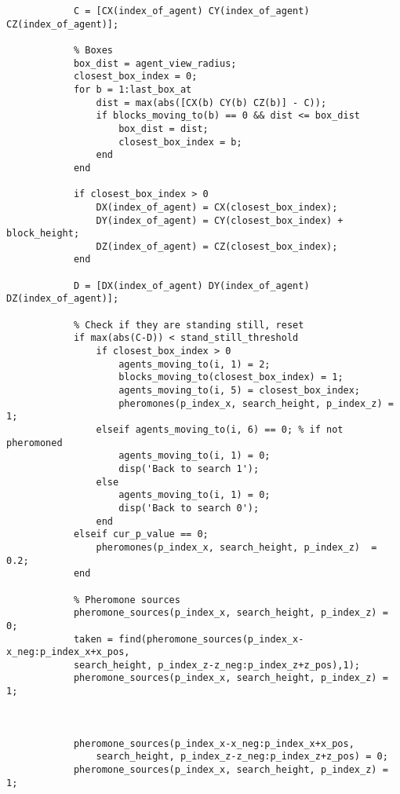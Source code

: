 \begin{lstlisting}
            C = [CX(index_of_agent) CY(index_of_agent) CZ(index_of_agent)];

            % Boxes
            box_dist = agent_view_radius;
            closest_box_index = 0;
            for b = 1:last_box_at 
                dist = max(abs([CX(b) CY(b) CZ(b)] - C));
                if blocks_moving_to(b) == 0 && dist <= box_dist
                    box_dist = dist;
                    closest_box_index = b;
                end
            end
           
            if closest_box_index > 0
                DX(index_of_agent) = CX(closest_box_index);
                DY(index_of_agent) = CY(closest_box_index) + block_height;
                DZ(index_of_agent) = CZ(closest_box_index);
            end
                
            D = [DX(index_of_agent) DY(index_of_agent) DZ(index_of_agent)];
            
            % Check if they are standing still, reset
            if max(abs(C-D)) < stand_still_threshold
                if closest_box_index > 0
                    agents_moving_to(i, 1) = 2;
                    blocks_moving_to(closest_box_index) = 1;
                    agents_moving_to(i, 5) = closest_box_index;
                    pheromones(p_index_x, search_height, p_index_z) = 1;  
                elseif agents_moving_to(i, 6) == 0; % if not pheromoned
                    agents_moving_to(i, 1) = 0;
                    disp('Back to search 1');
                else
                    agents_moving_to(i, 1) = 0;
                    disp('Back to search 0');
                end
            elseif cur_p_value == 0;
                pheromones(p_index_x, search_height, p_index_z)  = 0.2; 
            end
          
            % Pheromone sources
            pheromone_sources(p_index_x, search_height, p_index_z) = 0;
            taken = find(pheromone_sources(p_index_x-x_neg:p_index_x+x_pos, 
			search_height, p_index_z-z_neg:p_index_z+z_pos),1);
            pheromone_sources(p_index_x, search_height, p_index_z) = 1;
         
       
            
            pheromone_sources(p_index_x-x_neg:p_index_x+x_pos, 
				search_height, p_index_z-z_neg:p_index_z+z_pos) = 0;
            pheromone_sources(p_index_x, search_height, p_index_z) = 1;
            

            
            


\end{lstlisting}
